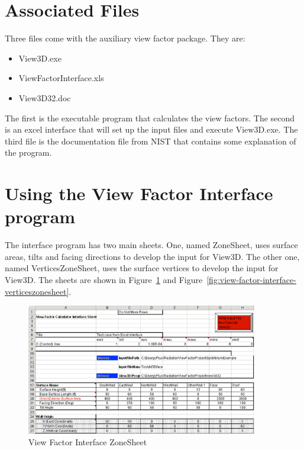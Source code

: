 \section{Associated Files}\label{associated-files}

Three files come with the auxiliary view factor package. They are:

\begin{itemize}
\item
  View3D.exe
\item
  ViewFactorInterface.xls
\item
  View3D32.doc
\end{itemize}

The first is the executable program that calculates the view factors. The second is an excel interface that will set up the input files and execute View3D.exe. The third file is the documentation file from NIST that contains some explanation of the program.

\section{Using the View Factor Interface program}\label{using-the-view-factor-interface-program}

The interface program has two main sheets. One, named ZoneSheet, uses surface areas, tilts and facing directions to develop the input for View3D. The other one, named VerticesZoneSheet, uses the surface vertices to develop the input for View3D. The sheets are shown in Figure~\ref{fig:view-factor-interface-zonesheet} and Figure~\ref{fig:view-factor-interface-verticeszonesheet}.

\begin{figure}[hbtp] %
\centering
\includegraphics[width=0.9\textwidth, height=0.9\textheight, keepaspectratio=true]{media/image022.png}
\caption{View Factor Interface ZoneSheet \protect \label{fig:view-factor-interface-zonesheet}}
\end{figure}

